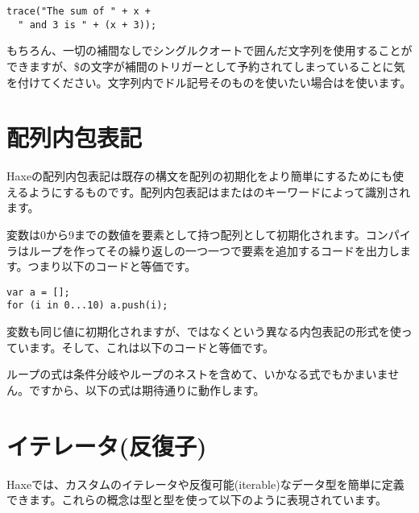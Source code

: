 \begin{lstlisting}
trace("The sum of " + x +
  " and 3 is " + (x + 3));
\end{lstlisting}

もちろん、一切の補間なしでシングルクオートで囲んだ文字列を使用することができますが、\$の文字が補間のトリガーとして予約されてしまっていることに気を付けてください。文字列内でドル記号そのものを使いたい場合は\expr{\$\$}を使います。


\section{配列内包表記}
\label{lf-array-comprehension}


Haxeの配列内包表記は既存の構文を配列の初期化をより簡単にするためにも使えるようにするものです。配列内包表記はまたはのキーワードによって識別されます。


変数は0から9までの数値を要素として持つ配列として初期化されます。コンパイラはループを作ってその繰り返しの一つ一つで要素を追加するコードを出力します。つまり以下のコードと等価です。

\begin{lstlisting}
var a = [];
for (i in 0...10) a.push(i);
\end{lstlisting}

変数も同じ値に初期化されますが、ではなくという異なる内包表記の形式を使っています。そして、これは以下のコードと等価です。

ループの式は条件分岐やループのネストを含めて、いかなる式でもかまいません。ですから、以下の式は期待通りに動作します。


\section{イテレータ(反復子)}
\label{lf-iterators}

Haxeでは、カスタムのイテレータや反復可能(iterable)なデータ型を簡単に定義できます。これらの概念は型と型を使って以下のように表現されています。

